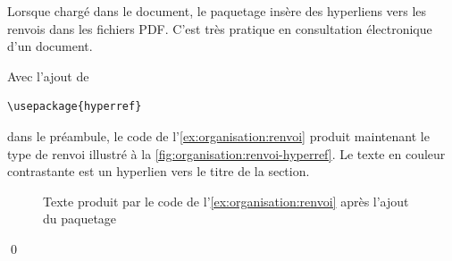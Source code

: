 Lorsque chargé dans le document, le paquetage  insère
des hyperliens vers les renvois dans les fichiers PDF. C'est très
pratique en consultation électronique d'un document.

\begin{exemple}
  \label{ex:organisation:renvoi-hyperref}
  Avec l'ajout de
\begin{lstlisting}
\usepackage{hyperref}
\end{lstlisting}
  dans le préambule, le code de l'\autoref{ex:organisation:renvoi}
  produit maintenant le type de renvoi illustré à la
  \autoref{fig:organisation:renvoi-hyperref}. Le texte en couleur
  contrastante est un hyperlien vers le titre de la section.

  \begin{figure}
    \centering
    \caption{Texte produit par le code de
      l'\autoref{ex:organisation:renvoi} après l'ajout du paquetage
      }
    \label{fig:organisation:renvoi-hyperref}
  \end{figure}
  \qed
\end{exemple}

